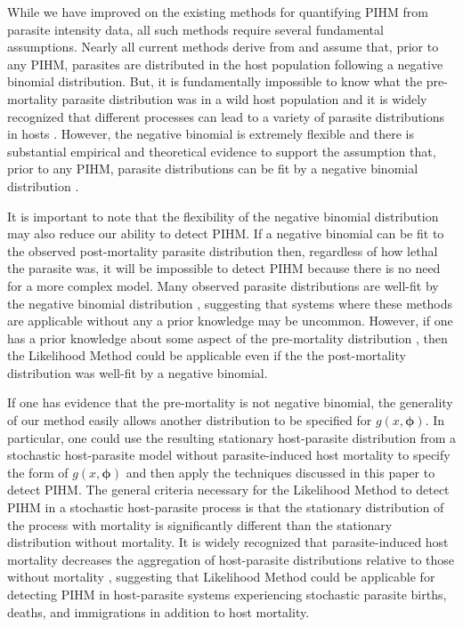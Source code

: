 \documentclass[12pt, a4paper]{article}
\begin{document}
While we have improved on the existing methods for quantifying
PIHM from parasite intensity data, all such methods require several
fundamental assumptions.  Nearly all current methods derive from \cite{Crofton1971a} \citep[but see][]{Ferguson2011} and assume that, prior to any PIHM, parasites are distributed in the host population following a
negative binomial distribution. But, it is fundamentally impossible to know
what the pre-mortality parasite distribution was in a wild host population and
it is widely recognized that different processes can lead to a variety of
parasite distributions in hosts \citep{Anderson1982a, Duerr2003}. However, the negative binomial is extremely
flexible and there is substantial empirical and theoretical evidence to support
the assumption that, prior to any PIHM, parasite distributions can be fit by a negative binomial distribution \citep{Shaw1995,Shaw1998,Wilson2002}.

It is important to note that the flexibility of the negative binomial distribution may also reduce our ability to detect PIHM. If
a negative binomial can be fit to the observed post-mortality parasite
distribution then, regardless of how lethal the parasite was, it will be
impossible to detect PIHM because there is no need for a more complex model.
Many observed parasite distributions are well-fit by the negative binomial distribution \citep{Shaw1998}, suggesting
that systems where these methods are applicable without any a prior knowledge may be uncommon. However, if one has a prior knowledge about some aspect of the pre-mortality distribution \citep[e.g. assumes/knows the value of $k_p$,][]{Ferguson2011}, then the Likelihood Method could be applicable even if the the post-mortality distribution was well-fit by a negative binomial.

If one has evidence that the pre-mortality is not negative binomial, the generality of our method easily allows another distribution to be specified for $g(x, \boldsymbol{\phi})$. In particular, one could use the
resulting stationary host-parasite distribution from a stochastic host-parasite
model without parasite-induced host mortality \citep{Anderson1982a} to specify
the form of $g(x, \boldsymbol{\phi})$ and then apply the techniques discussed
in this paper to detect PIHM.  The general criteria necessary
for the Likelihood Method to detect PIHM in a stochastic host-parasite process
is that the stationary distribution of the process with
mortality is significantly different than the stationary distribution without mortality.
It is widely recognized that parasite-induced host mortality decreases the
aggregation of host-parasite distributions relative to those without mortality
\citep{Barbour2000}, suggesting that Likelihood Method could be applicable for
detecting PIHM in host-parasite systems experiencing stochastic parasite births, deaths, and immigrations in addition to host mortality.
\end{document}
